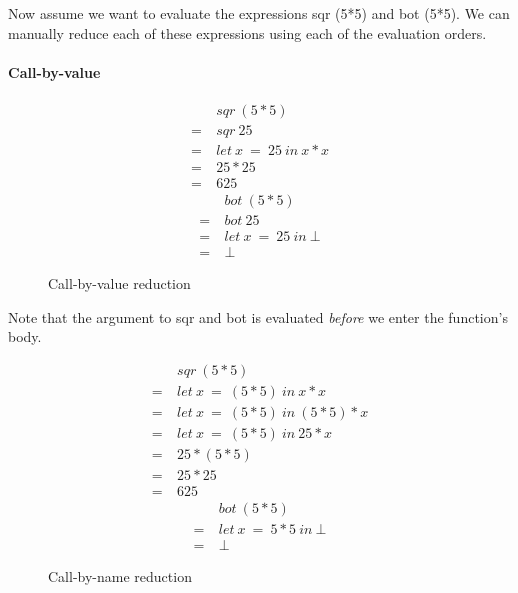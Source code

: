 Now assume we want to evaluate the expressions \<sqr (5*5)\> and \<bot (5*5)\>.
We can manually reduce each of these expressions using each of the evaluation
orders.

\paragraph{Call-by-value}

\begin{figure}[H]
\centering
\begin{multicols}{2}
\noindent
\begin{align*}
     &sqr\ (5*5) \\
  =\ &sqr\ 25 \\
  =\ &let\ x\ =\ 25\ in\ x * x \\
  =\ &25 * 25 \\
  =\ &625
\end{align*}
\begin{align*}
     &bot\ (5*5) \\
  =\ &bot\ 25 \\
  =\ &let\ x\ =\ 25\ in\ \bot \\
  =\ &\bot
\end{align*}
\end{multicols}
\caption{Call-by-value reduction}
\label{fig:call-by-value}
\end{figure}

Note that the argument to \<sqr\> and \<bot\> is evaluated \emph{before}
we enter the function's body.\\[1.5cm]

\begin{figure}[H]
\centering
\begin{multicols}{2}
\noindent
\begin{align*}
     &sqr\ (5*5) \\
  =\ &let\ x \  =\ (5*5)\ in\ x * x \\
  =\ &let\ x \  =\ (5*5)\ in\ (5*5) * x \\
  =\ &let\ x \  =\ (5*5)\ in\ 25 * x \\
  =\ &25 * (5*5) \\
  =\ &25 * 25 \\
  =\ &625
\end{align*}
\begin{align*}
     &bot\ (5*5) \\
  =\ &let\ x\ =\ 5*5\ in\ \bot \\
  =\ &\bot
\end{align*}
\end{multicols}
\caption{Call-by-name reduction}
\label{fig:call-by-name}
\end{figure}

